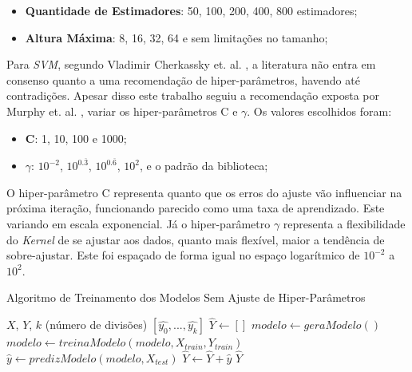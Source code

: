 \begin{itemize}
    \item \textbf{Quantidade de Estimadores}: 50, 100, 200, 400, 800 estimadores;
    \item \textbf{Altura Máxima}: 8, 16, 32, 64 e sem limitações no tamanho;
\end{itemize}

Para \textit{\acrshort{SVM}}, segundo Vladimir Cherkassky et. al. \cite{CHERKASSKY2004113}, a literatura não entra em consenso quanto a uma recomendação de hiper-parâmetros, havendo até contradições. Apesar disso este trabalho seguiu a recomendação exposta por Murphy et. al. \cite{murphy2012machine}, variar os hiper-parâmetros C e  \(\gamma\). Os valores escolhidos foram:

\begin{itemize}
    \item \textbf{C}: 1, 10, 100 e 1000;
    \item \textbf{\(\gamma\)}: \(10^{-2}\), \(10^{0.\overline{3}}\), \(10^{0.\overline{6}}\), \( 10^{2}\), e o padrão da biblioteca; 
\end{itemize}

O hiper-parâmetro C representa quanto que os erros do ajuste vão influenciar na próxima iteração, funcionando parecido como uma taxa de aprendizado. Este variando em escala exponencial. Já o hiper-parâmetro \(\gamma\) representa a flexibilidade do \textit{Kernel} de se ajustar aos dados, quanto mais flexível, maior a tendência de sobre-ajustar. Este foi espaçado de forma igual no espaço logarítmico de \(10^{-2}\) a \(10^{2}\).

\begin{algorithm}
\caption{Algoritmo de Treinamento dos Modelos Sem Ajuste de Hiper-Parâmetros}
\begin{algorithmic}
\label{algo:training}
\REQUIRE $X$, $Y$, $k$ (número de divisões)
\ENSURE $[\hat{y_0}, ..., \hat{y_k}]$
\STATE $\hat{Y} \leftarrow [] $
\newline
{} 
    \STATE $modelo \leftarrow geraModelo()$
    \STATE $modelo \leftarrow treinaModelo(modelo, X_{train}, Y_{train})$ 
    \newline
    \STATE $\hat{y} \leftarrow predizModelo(modelo, X_{test}) $
    \STATE $\hat{Y} \leftarrow \hat{Y} + \hat{y}$
\ENDFOR
\newline
\RETURN $\hat{Y}$
\end{algorithmic}
\end{algorithm}

